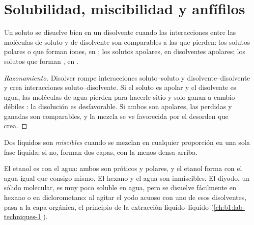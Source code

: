 \section{Solubilidad, miscibilidad y anfífilos}

\begin{proposition}\label{prop:b1:intermolecular-forces-solvents:like}
Un soluto se disuelve bien en un disolvente cuando las interacciones
entre las moléculas de soluto y de disolvente son comparables a las que
pierden: los solutos polares o que forman iones, en ;
los solutos apolares, en disolventes apolares; los solutos que forman
, en .
\end{proposition}

\begin{proof}[Razonamiento]
Disolver rompe interacciones soluto--soluto y disolvente--disolvente y
crea interacciones soluto--disolvente. Si el soluto es apolar y el
disolvente es agua, las moléculas de agua pierden 
para hacerle sitio y solo ganan a cambio débiles :
la disolución es desfavorable. Si ambos son apolares, las  perdidas y ganadas son comparables, y la mezcla se ve
favorecida por el desorden que crea.
\end{proof}

\begin{definition}\label{def:b1:intermolecular-forces-solvents:miscibility}
Dos líquidos son \emph{miscibles} cuando se mezclan en
cualquier proporción en una sola fase líquida; si no, forman dos capas,
con la menos densa arriba.
\end{definition}

\begin{example}\label{ex:b1:intermolecular-forces-solvents:miscible}
El etanol es  con el agua: ambos son próticos y polares, y el
etanol forma  con el agua igual que consigo mismo.
El hexano y el agua son inmiscibles. El diyodo, un sólido molecular, es
muy poco soluble en agua, pero se disuelve fácilmente en hexano o en
diclorometano: al agitar el yodo acuoso con uno de esos disolventes, pasa
a la capa orgánica, el principio de la extracción líquido--líquido
(\cref{ch:b1:lab-techniques-1}).
\end{example}

